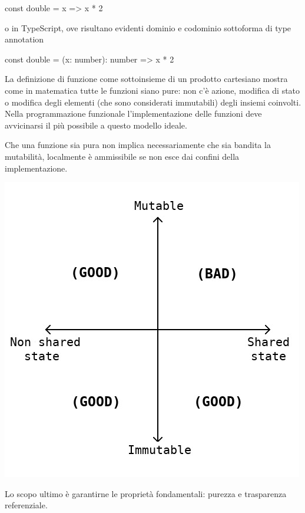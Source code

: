 \documentclass[12pt]{article}
\theoremstyle{definition}
\newenvironment{code}
  {\vspace{0.5cm} \VerbatimEnvironment\begin{typescriptcode}}
  {\end{typescriptcode} \vspace{0.2cm}}
\begin{document}
\begin{code}
const double = x => x * 2
\end{code}

o in TypeScript, ove risultano evidenti dominio e codominio sottoforma di type annotation

\begin{code}
const double = (x: number): number => x * 2
\end{code}

La definizione di funzione come sottoinsieme di un prodotto cartesiano mostra come in matematica tutte le funzioni siano pure:
non c'è azione, modifica di stato o modifica degli elementi (che sono considerati immutabili) degli insiemi coinvolti.
Nella programmazione funzionale l'implementazione delle funzioni deve avvicinarsi il più possibile a questo modello ideale.

Che una funzione sia pura non implica necessariamente che sia bandita la mutabilità, localmente è ammissibile
se non esce dai confini della implementazione.

\begin{center}
	\includegraphics[scale=0.5]{mutable-immutable}
\end{center}

Lo scopo ultimo è garantirne le proprietà fondamentali: purezza e trasparenza referenziale.
\end{document}
